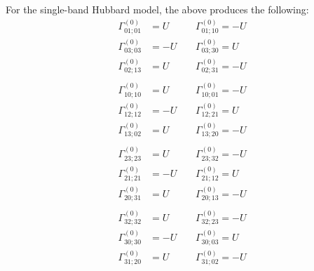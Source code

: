 For the single-band Hubbard model, the above produces
the following:
\begin{eqnarray}
\Gamma^{(0)}_{01;01} & = U  \;\;\;\; & \Gamma^{(0)}_{01;10} = -U \\
\Gamma^{(0)}_{03;03} & = -U \;\;\;\; & \Gamma^{(0)}_{03;30} = U \\
\Gamma^{(0)}_{02;13} & = U \;\;\;\; & \Gamma^{(0)}_{02;31} = -U \\
\\
\Gamma^{(0)}_{10;10} & = U \;\;\;\; & \Gamma^{(0)}_{10;01} = -U \\
\Gamma^{(0)}_{12;12} & = -U \;\;\;\; & \Gamma^{(0)}_{12;21} = U \\
\Gamma^{(0)}_{13;02} & = U \;\;\;\; & \Gamma^{(0)}_{13;20} = -U \\
\\
\Gamma^{(0)}_{23;23} & = U \;\;\;\; & \Gamma^{(0)}_{23;32} = -U \\
\Gamma^{(0)}_{21;21} & = -U \;\;\;\; & \Gamma^{(0)}_{21;12} = U \\
\Gamma^{(0)}_{20;31} & = U \;\;\;\; & \Gamma^{(0)}_{20;13} = -U \\
\\
\Gamma^{(0)}_{32;32} & = U \;\;\;\; & \Gamma^{(0)}_{32;23} = -U \\
\Gamma^{(0)}_{30;30} & = -U  \;\;\;\; & \Gamma^{(0)}_{30;03} = U \\
\Gamma^{(0)}_{31;20} & = U \;\;\;\; & \Gamma^{(0)}_{31;02} = -U 
\end{eqnarray}
